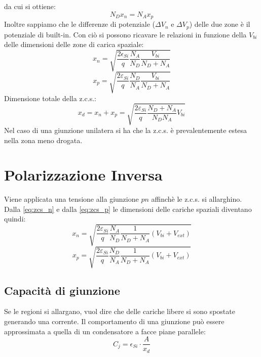 \documentclass{article}
\begin{document}
da cui si ottiene:
\begin{equation*}
N_Dx_n = N_Ax_p
\end{equation*}
Inoltre sappiamo che le differenze di potenziale ($\Delta V_n$ e $\Delta V_p$) delle due zone è il potenziale di built-in. Con ciò si possono ricavare le relazioni in funzione della $V_{bi}$ delle dimensioni delle zone di carica spaziale:
\begin{equation} \label{eq:zcs_n}
x_n = \sqrt{\frac{2\epsilon_{Si}}{q} \frac{N_A}{N_D} \frac{V_{bi}}{N_D+N_A}}
\end{equation}
\begin{equation} \label{eq:zcs_p}
x_p = \sqrt{\frac{2\varepsilon_{Si}}{q} \frac{N_D}{N_A} \frac{V_{bi}}{N_D+N_A}}
\end{equation}
Dimensione totale della z.c.s.:
\begin{equation*}
x_d = x_n + x_p = \sqrt{\frac{2\varepsilon_{Si}}{q} \frac{N_D+N_A}{N_DN_A} V_{bi}}
\end{equation*}
Nel caso di una giunzione unilatera si ha che la z.c.s. è prevalentemente estesa nella zona meno drogata.

\section*{Polarizzazione Inversa}
Viene applicata una tensione alla giunzione $pn$ affinchè le z.c.s. si allarghino. Dalla \eqref{eq:zcs_n} e dalla \eqref{eq:zcs_p} le dimensioni delle cariche spaziali diventano quindi:
\begin{equation*}
x_n = \sqrt{\frac{2\varepsilon_{Si}}{q} \frac{N_A}{N_D} \frac{1}{N_D+N_A} (V_{bi} + V_{ext})}
\end{equation*}
\begin{equation*}
x_p = \sqrt{\frac{2\varepsilon_{Si}}{q} \frac{N_D}{N_A} \frac{1}{N_D+N_A} (V_{bi} + V_{ext})}
\end{equation*}

\subsection*{Capacità di giunzione}
Se le regioni si allargano, vuol dire che delle cariche libere si sono spostate generando una corrente.
Il comportamento di una giunzione può essere approssimata a quella di un condensatore a facce piane parallele:
\begin{equation*}
C_j = \epsilon_{Si} \cdot \frac{A}{x_d}
\end{equation*}
\end{document}

